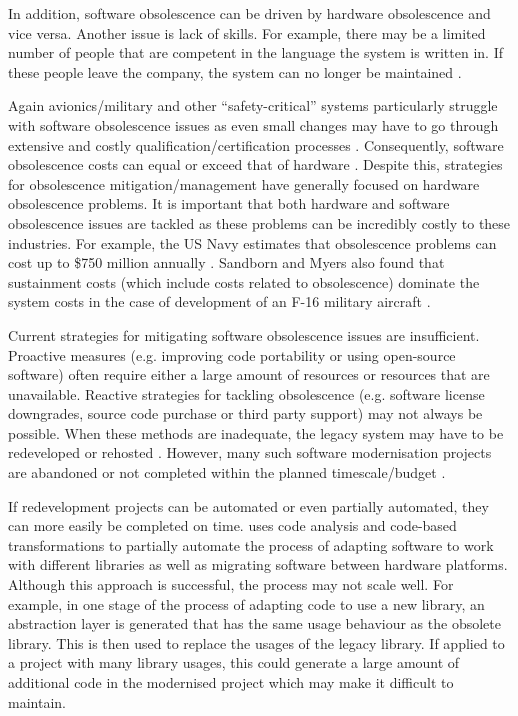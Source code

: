 \documentclass{UoYCSproject}
\begin{document}
In addition, software obsolescence can be driven by hardware obsolescence and vice versa. Another issue is lack of skills. For example, there may be a limited number of people that are competent in the language the system is written in. If these people leave the company, the system can no longer be maintained \parencite{rajagopal2014software}. 

Again avionics/military and other ``safety-critical'' systems particularly struggle with software obsolescence issues as even small changes may have to go through extensive and costly qualification/certification processes \parencite{singh2006obsolescence}. Consequently, software obsolescence costs can equal or exceed that of hardware \parencite{sandborn2007obsolescence}. Despite this, strategies for obsolescence mitigation/management have generally focused on hardware obsolescence problems. It is important that both hardware and software obsolescence issues are tackled as these problems can be incredibly costly to these industries. For example, the US Navy estimates that obsolescence problems can cost up to \$750 million annually \parencite{adams2005getting}. Sandborn and Myers also found that sustainment costs (which include costs related to obsolescence) dominate the system costs in the case of development of an F-16 military aircraft \parencite{sandborn2008designing}. 
 
Current strategies for mitigating software obsolescence issues are insufficient. Proactive measures (e.g. improving code portability or using open-source software) often require either a large amount of resources or resources that are unavailable. Reactive strategies for tackling obsolescence (e.g. software license downgrades, source code purchase or third party support) may not always be possible. When these methods are inadequate, the legacy system may have to be redeveloped or rehosted \parencite{sandborn2007obsolescence}. However, many such software modernisation projects are abandoned or not completed within the planned timescale/budget \parencite{kowalczyk2009model}. 

If redevelopment projects can be automated or even partially automated, they can more easily be completed on time. \parencite{gerasimou2017technical} uses code analysis and code-based transformations to partially automate the process of adapting software to work with different libraries as well as migrating software between hardware platforms. Although this approach is successful, the process may not scale well. For example, in one stage of the process of adapting code to use a new library, an abstraction layer is generated that has the same usage behaviour as the obsolete library. This is then used to replace the usages of the legacy library. If applied to a project with many library usages, this could generate a large amount of additional code in the modernised project which may make it difficult to maintain. 
\end{document}
